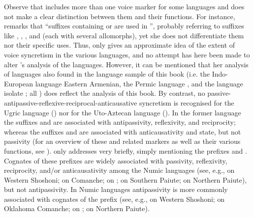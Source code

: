 Observe that \citet{geniusiene:1987} includes more than one voice marker for some languages and does not make a clear distinction between them and their functions. For instance, \cite[305]{geniusiene:1987} remarks that “suffixes containing  or  are used in ”, probably referring to suffixes like , , , and  (each with several allomorphs), yet she does not differentiate them nor their specific uses. Thus,  only gives an approximate idea of the extent of voice syncretism in the various languages, and no attempt has here been made to alter \citeauthor{geniusiene:1987}’s analysis of the languages. However, it can be mentioned that her analysis of languages also found in the language sample of this book (i.e. the Indo-European language Eastern Armenian, the Permic language , and the language isolate ; all ) does reflect the analysis of this book. By contrast, no passive-antipassive-reflexive-reciprocal-anticausative syncretism is recognised for the Ugric language  () nor for the Uto-Aztecan language  (). In the former language the suffixes  and  are associated with antipassivity, reflexivity, and reciprocity; whereas the suffixes  and  are associated with anticausativity and  state, but not passivity (for an overview of these and related markers as well as their various functions, see \citealt{karoly:1982}). \citet[306]{geniusiene:1987} only addresses  very briefly, simply mentioning the prefixes  and . Cognates of these prefixes are widely associated with passivity, reflexivity, reciprocity, and/or anticausativity among the Numic languages (see, e.g., \citealt[118ff.]{crum:dayley:1993} on Western Shoshoni; \citealt[125ff.]{charney:1993} on Comanche; \citealt[104ff.]{dayley:1989} on ; \citealt[108ff.]{sapir:1930} on Southern Paiute; \citealt[373ff.]{thornes:2003} on Northern Paiute), but not antipassivity. In Numic languages antipassivity is more commonly associated with cognates of the prefix  (see, e.g., \citealt[122f.]{crum:dayley:1993} on Western Shoshoni; \citealt[128f.]{charney:1993} on Oklahoma Comanche; \citealt[111f.]{dayley:1989} on ; \citealt[379ff.]{thornes:2003} on Northern Paiute). 

